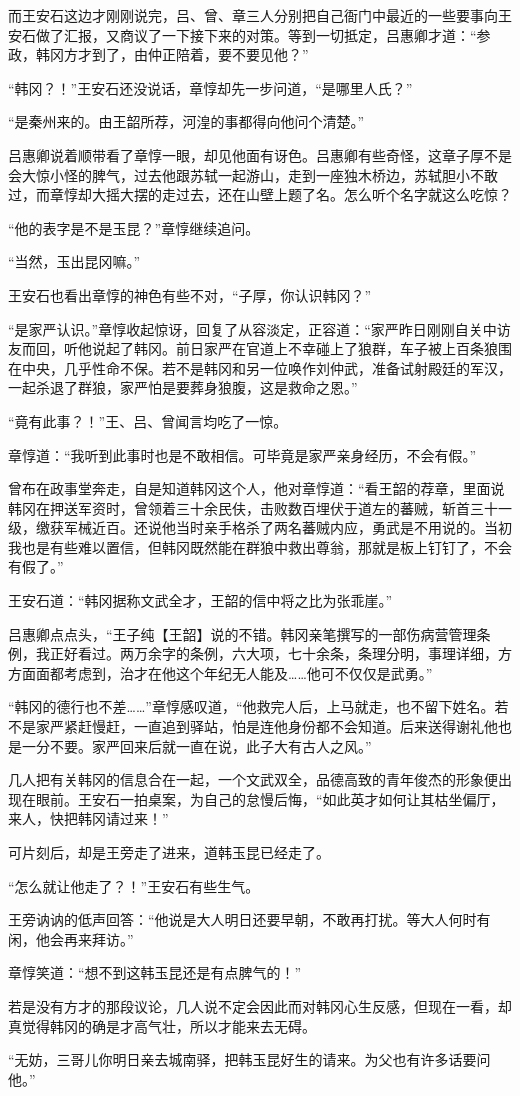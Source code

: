 而王安石这边才刚刚说完，吕、曾、章三人分别把自己衙门中最近的一些要事向王安石做了汇报，又商议了一下接下来的对策。等到一切抵定，吕惠卿才道：“参政，韩冈方才到了，由仲正陪着，要不要见他？”

“韩冈？！”王安石还没说话，章惇却先一步问道，“是哪里人氏？”

“是秦州来的。由王韶所荐，河湟的事都得向他问个清楚。”

吕惠卿说着顺带看了章惇一眼，却见他面有讶色。吕惠卿有些奇怪，这章子厚不是会大惊小怪的脾气，过去他跟苏轼一起游山，走到一座独木桥边，苏轼胆小不敢过，而章惇却大摇大摆的走过去，还在山壁上题了名。怎么听个名字就这么吃惊？

“他的表字是不是玉昆？”章惇继续追问。

“当然，玉出昆冈嘛。”

王安石也看出章惇的神色有些不对，“子厚，你认识韩冈？”

“是家严认识。”章惇收起惊讶，回复了从容淡定，正容道：“家严昨日刚刚自关中访友而回，听他说起了韩冈。前日家严在官道上不幸碰上了狼群，车子被上百条狼围在中央，几乎性命不保。若不是韩冈和另一位唤作刘仲武，准备试射殿廷的军汉，一起杀退了群狼，家严怕是要葬身狼腹，这是救命之恩。”

“竟有此事？！”王、吕、曾闻言均吃了一惊。

章惇道：“我听到此事时也是不敢相信。可毕竟是家严亲身经历，不会有假。”

曾布在政事堂奔走，自是知道韩冈这个人，他对章惇道：“看王韶的荐章，里面说韩冈在押送军资时，曾领着三十余民伕，击败数百埋伏于道左的蕃贼，斩首三十一级，缴获军械近百。还说他当时亲手格杀了两名蕃贼内应，勇武是不用说的。当初我也是有些难以置信，但韩冈既然能在群狼中救出尊翁，那就是板上钉钉了，不会有假了。”

王安石道：“韩冈据称文武全才，王韶的信中将之比为张乖崖。”

吕惠卿点点头，“王子纯【王韶】说的不错。韩冈亲笔撰写的一部伤病营管理条例，我正好看过。两万余字的条例，六大项，七十余条，条理分明，事理详细，方方面面都考虑到，治才在他这个年纪无人能及……他可不仅仅是武勇。”

“韩冈的德行也不差……”章惇感叹道，“他救完人后，上马就走，也不留下姓名。若不是家严紧赶慢赶，一直追到驿站，怕是连他身份都不会知道。后来送得谢礼他也是一分不要。家严回来后就一直在说，此子大有古人之风。”

几人把有关韩冈的信息合在一起，一个文武双全，品德高致的青年俊杰的形象便出现在眼前。王安石一拍桌案，为自己的怠慢后悔，“如此英才如何让其枯坐偏厅，来人，快把韩冈请过来！”

可片刻后，却是王旁走了进来，道韩玉昆已经走了。

“怎么就让他走了？！”王安石有些生气。

王旁讷讷的低声回答：“他说是大人明日还要早朝，不敢再打扰。等大人何时有闲，他会再来拜访。”

章惇笑道：“想不到这韩玉昆还是有点脾气的！”

若是没有方才的那段议论，几人说不定会因此而对韩冈心生反感，但现在一看，却真觉得韩冈的确是才高气壮，所以才能来去无碍。

“无妨，三哥儿你明日亲去城南驿，把韩玉昆好生的请来。为父也有许多话要问他。”

